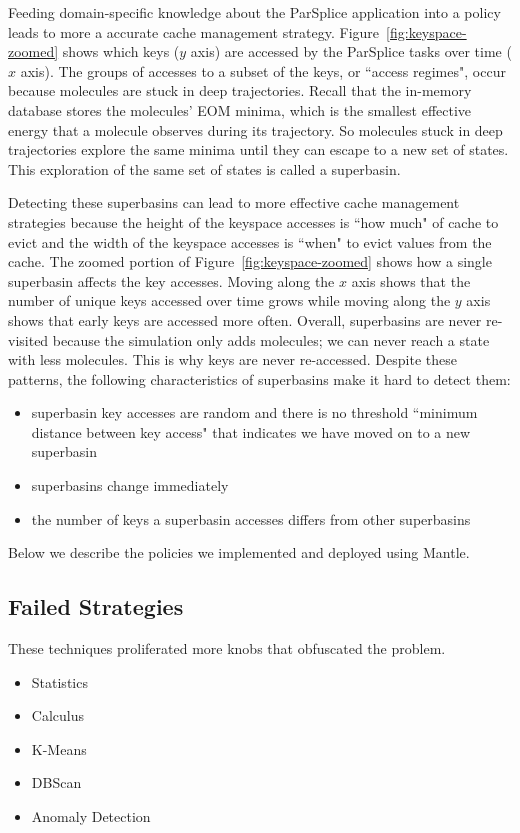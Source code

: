 Feeding domain-specific knowledge about the ParSplice application into a policy
leads to more a accurate cache management strategy.
Figure~\ref{fig:keyspace-zoomed} shows which keys (\(y\) axis) are accessed by
the ParSplice tasks over time (\(x\) axis). The groups of accesses to a subset
of the keys, or ``access regimes", occur because molecules are stuck in deep
trajectories. Recall that the in-memory database stores the molecules' EOM
minima, which is the smallest effective energy that a molecule observes during
its trajectory. So molecules stuck in deep trajectories explore the same minima
until they can escape to a new set of states. This exploration of the same set
of states is called a superbasin. 

Detecting these superbasins can lead to more effective cache management
strategies because the height of the keyspace accesses is ``how much" of cache
to evict and the width of the keyspace accesses is ``when" to evict values from
the cache.  The zoomed portion of Figure~\ref{fig:keyspace-zoomed} shows how a
single superbasin affects the key accesses. Moving along the \(x\) axis shows
that the number of unique keys accessed over time grows while moving along the
\(y\) axis shows that early keys are accessed more often.  Overall, superbasins
are never re-visited because the simulation only adds molecules; we can never
reach a state with less molecules. This is why keys are never re-accessed.
Despite these patterns, the following characteristics of superbasins make it
hard to detect them:

\begin{itemize}

  \item superbasin key accesses are random and there is no threshold ``minimum distance
  between key access" that indicates we have moved on to a new superbasin

  \item superbasins change immediately

  \item the number of keys a superbasin accesses differs from other superbasins

\end{itemize}

Below we describe the policies we implemented and deployed using Mantle. 

\subsection{Failed Strategies}
These techniques proliferated more knobs that obfuscated the problem. 
\begin{itemize}
  \item Statistics
  \item Calculus
  \item K-Means
  \item DBScan
  \item Anomaly Detection
\end{itemize}

